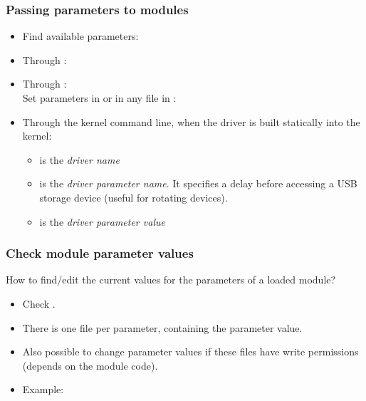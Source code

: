 \begin{frame}
  \frametitle{Passing parameters to modules}
  \begin{itemize}
  \item Find available parameters:\\
  \item Through :\\
  \item Through :\\
    Set parameters in  or in any file in :\\
  \item Through the kernel command line, when the driver is built statically into the kernel:\\
    \begin{itemize}
    \item {} is the {\em driver name}
    \item {} is the {\em driver parameter name}. It
      specifies a delay before accessing a USB storage device (useful for
      rotating devices).
    \item {} is the {\em driver parameter value}
    \end{itemize}
  \end{itemize}
\end{frame}

\begin{frame}
  \frametitle{Check module parameter values}
  How to find/edit the current values for the parameters of a loaded module?
  \begin{itemize}
  \item Check .
  \item There is one file per parameter, containing the parameter value.
  \item Also possible to change parameter values if these files have
        write permissions (depends on the module code).
  \item Example:\\
  \end{itemize}
\end{frame}


